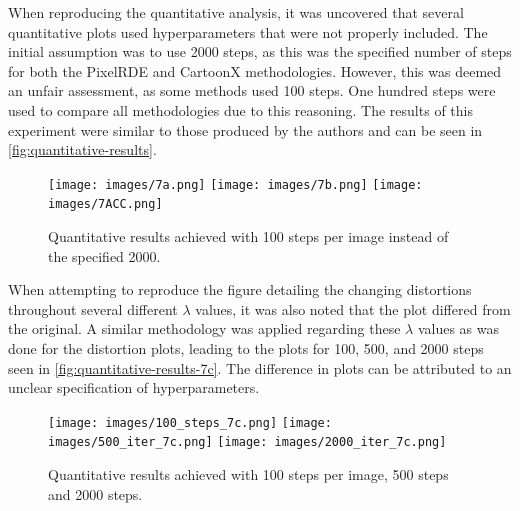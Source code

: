When reproducing the quantitative analysis, it was uncovered that several quantitative plots used hyperparameters that were not properly included. The initial assumption was to use 2000 steps, as this was the specified number of steps for both the PixelRDE and CartoonX methodologies. However, this was deemed an unfair assessment, as some methods used 100 steps. One hundred steps were used to compare all methodologies due to this reasoning. The results of this experiment were similar to those produced by the authors and can be seen in \autoref{fig:quantitative-results}.



\begin{figure}[ht]

\centering
\texttt{[image: images/7a.png]}\hfill
\texttt{[image: images/7b.png]}\hfill
\texttt{[image: images/7ACC.png]}

\caption{Quantitative results achieved with 100 steps per image instead of the specified 2000.}



\label{fig:quantitative-results}

\end{figure}

When attempting to reproduce the figure detailing the changing distortions throughout several different $\lambda$ values, it was also noted that the plot differed from the original. A similar methodology was applied regarding these $\lambda$ values as was done for the distortion plots, leading to the plots for 100, 500, and 2000 steps seen in \autoref{fig:quantitative-results-7c}. The difference in plots can be attributed to an unclear specification of hyperparameters.

\begin{figure}[H]

\centering
\texttt{[image: images/100\_steps\_7c.png]}\hfill
\texttt{[image: images/500\_iter\_7c.png]}\hfill
\texttt{[image: images/2000\_iter\_7c.png]}

\caption{Quantitative results achieved with 100 steps per image, 500 steps and 2000 steps.}
\label{fig:quantitative-results-7c}

\end{figure}


